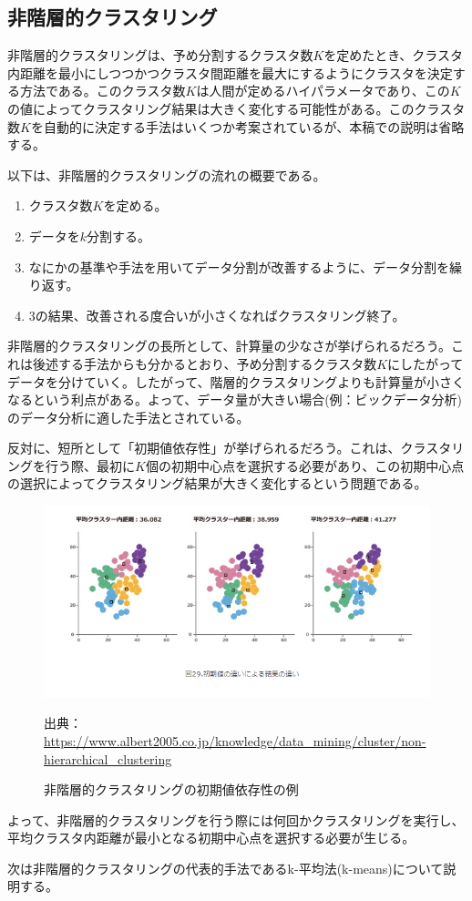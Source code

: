 \documentclass[dvipdfmx]{jsarticle}
\begin{document}
\subsection{非階層的クラスタリング}
非階層的クラスタリングは、予め分割するクラスタ数$K$を定めたとき、クラスタ内距離を最小にしつつかつクラスタ間距離を最大にするようにクラスタを決定する方法である。このクラスタ数$K$は人間が定めるハイパラメータであり、この$K$の値によってクラスタリング結果は大きく変化する可能性がある。このクラスタ数$K$を自動的に決定する手法はいくつか考案されているが、本稿での説明は省略する。\par
以下は、非階層的クラスタリングの流れの概要である。
\begin{enumerate}
  \item クラスタ数$K$を定める。
  \item データを$k$分割する。
  \item なにかの基準や手法を用いてデータ分割が改善するように、データ分割を繰り返す。
  \item 3の結果、改善される度合いが小さくなればクラスタリング終了。
\end{enumerate}
非階層的クラスタリングの長所として、計算量の少なさが挙げられるだろう。これは後述する手法からも分かるとおり、予め分割するクラスタ数$K$にしたがってデータを分けていく。したがって、階層的クラスタリングよりも計算量が小さくなるという利点がある。よって、データ量が大きい場合(例：ビックデータ分析)のデータ分析に適した手法とされている。\par
反対に、短所として「初期値依存性」が挙げられるだろう。これは、クラスタリングを行う際、最初に$K$個の初期中心点を選択する必要があり、この初期中心点の選択によってクラスタリング結果が大きく変化するという問題である。
\begin{figure}[H]
  \centering
  \includegraphics[scale=0.4]{images/k-problem.png}
  \caption{非階層的クラスタリングの初期値依存性の例}
  出典：\url{https://www.albert2005.co.jp/knowledge/data_mining/cluster/non-hierarchical_clustering}
\end{figure}
よって、非階層的クラスタリングを行う際には何回かクラスタリングを実行し、平均クラスタ内距離が最小となる初期中心点を選択する必要が生じる。\par
次は非階層的クラスタリングの代表的手法であるk-平均法(k-means)について説明する。
\end{document}
